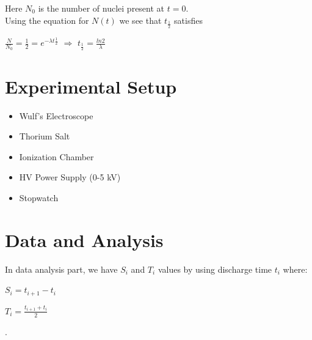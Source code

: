 \documentclass[aps,twocolumn,secnumarabic,nobalancelastpage,amsmath,amssymb,
nofootinbib]{revtex4}
\begin{document}
Here ${N}_{0}$ is the number of nuclei present at $t=0$.\\

Using the equation for $N(t)$ we see that ${t}_{\frac{1}{2}}$   satisfies 

\begin{center}

$\frac{N}{{N}_{0}}=\frac{1}{2}={e}^{-\lambda{{t}{\frac{1}{2}}}}$ $\Longrightarrow$ ${t}_{\frac{1}{2}}=\frac{ln2}{\lambda}$

\end{center}

\section{Experimental Setup}

\begin{itemize}
\item Wulf's Electroscope 
\item Thorium Salt
\item Ionization Chamber
\item HV Power Supply (0-5 kV)
\item Stopwatch
\end{itemize}

\section{Data and Analysis}
In data analysis part, we have $S_{i}$ and $T_{i}$ values by using discharge time $t_{i}$ where:

\begin{center}
${S}_{i}= {t}_{i+1}- {t}_{i} $
\end{center}



\begin{center}
${T}_{i}=\frac{{t}_{i+1}+{t}_{i}}{2}$
\end{center}.
\end{document}
